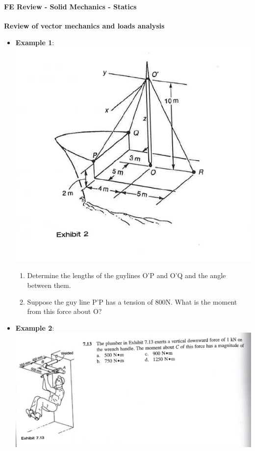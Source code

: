 \documentclass[11pt]{article}
\begin{document}
\textbf{ \LARGE FE Review - Solid Mechanics - Statics} \\\\
\textbf{ \LARGE Review of vector mechanics and loads analysis } \\

\begin{itemize}

	\item  \textbf{\LARGE Example 1}:\\
\includegraphics[scale=.75]{lecture1_fig1.png}
		\LARGE
		\begin{enumerate}
			\item Determine the lengths of the guylines O'P and O'Q and the angle between them.\\

			\item Suppose the guy line P'P has a tension of 800N. What is the moment from this force about O?

		\end{enumerate}

\newpage
	\item  \textbf{\LARGE Example 2}:\\
\includegraphics[scale=.5]{lecture1_fig2.png}
		\LARGE


\end{itemize}
\end{document}
